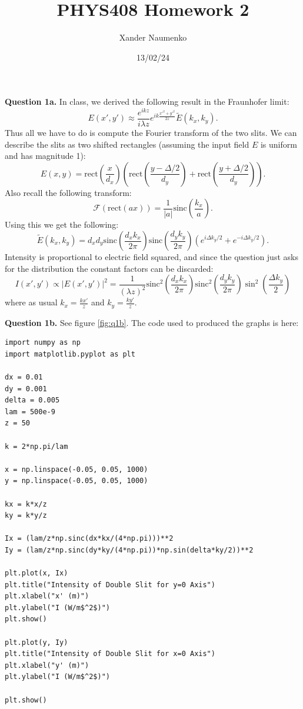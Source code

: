 \documentclass[letterpaper, reqno,11pt]{article}
\begin{document}
\title{PHYS408 Homework 2}
\date{13/02/24}
\author{Xander Naumenko}
\maketitle

{\medskip\noindent\bf Question 1a.} In class, we derived the following result in the Fraunhofer limit:
\[
    E(x',y')\approx \frac{e^{ikz}}{i\lambda z}e^{ik \frac{x'^2+y'^2}{2z}}\tilde E(k_x,k_y)
.\]
Thus all we have to do is compute the Fourier transform of the two slits. We can describe the slits as two shifted rectangles (assuming the input field $E$ is uniform and has magnitude 1):
\[
E(x,y) = \text{rect}\left(\frac{x}{d_x}\right)\left( \text{rect}\left( \frac{y-\Delta /2}{d_y} \right) +\text{rect}\left( \frac{y+\Delta /2}{d_y} \right)  \right) 
.\]
Also recall the following transform:
\[
    \mathcal F(\text{rect}(ax))=\frac{1}{|a|}\text{sinc}\left( \frac{k_x}{a} \right) 
.\]
Using this we get the following:
\[
    \tilde E(k_x, k_y) = d_xd_y \text{sinc}\left(\frac{d_xk_x}{2\pi}\right)\text{sinc}\left(\frac{d_yk_y}{2\pi}\right)\left( e^{i\Delta k_y /2}+e^{-i\Delta k_y /2} \right) 
.\]
Intensity is proportional to electric field squared, and since the question just asks for the distribution the constant factors can be discarded:
\[
I(x',y') \propto |E(x',y')|^2=\frac{1}{(\lambda z)^2} \text{sinc}^2\left(\frac{d_xk_x}{2\pi}\right)\text{sinc}^2\left(\frac{d_yk_y}{2\pi}\right)\sin^2\left( \frac{\Delta k_y}{2} \right) 
\]
where as usual $k_x= \frac{kx'}{z}$ and $k_y=\frac{ky'}{z}$.

{\medskip\noindent\bf Question 1b.} See figure \ref{fig:q1b}. The code used to produced the graphs is here:
\begin{lstlisting}
import numpy as np
import matplotlib.pyplot as plt

dx = 0.01
dy = 0.001
delta = 0.005
lam = 500e-9
z = 50

k = 2*np.pi/lam

x = np.linspace(-0.05, 0.05, 1000)
y = np.linspace(-0.05, 0.05, 1000)

kx = k*x/z
ky = k*y/z

Ix = (lam/z*np.sinc(dx*kx/(4*np.pi)))**2
Iy = (lam/z*np.sinc(dy*ky/(4*np.pi))*np.sin(delta*ky/2))**2

plt.plot(x, Ix)
plt.title("Intensity of Double Slit for y=0 Axis")
plt.xlabel("x' (m)")
plt.ylabel("I (W/m$^2$)")
plt.show()

plt.plot(y, Iy)
plt.title("Intensity of Double Slit for x=0 Axis")
plt.xlabel("y' (m)")
plt.ylabel("I (W/m$^2$)")

plt.show()
\end{lstlisting}
\end{document}
